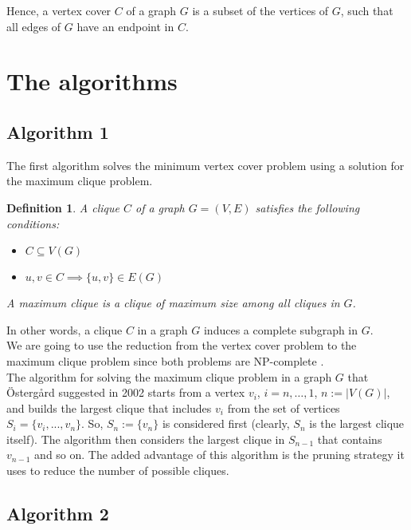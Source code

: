 \documentclass[11pt,a4paper]{article}
\newtheorem*{definition}{Definition}
\begin{document}
Hence, a vertex cover $C$ of a graph $G$ is a subset of the vertices of $G$, such that all edges of $G$ have an endpoint in $C$. \\


\section{The algorithms}

\subsection{Algorithm 1}
The first algorithm solves the minimum vertex cover problem using a solution for the maximum clique problem.
\begin{definition}
A \emph{clique} $C$ of a graph $G=(V,E)$ satisfies the following conditions:

\begin{itemize}
\item $C \subseteq V(G)$
\item $u, v \in C \implies \{u, v\} \in E(G)$
\end{itemize}

A \emph{maximum clique} is a clique of maximum size among all cliques in $G$.
\end{definition}

In other words, a clique $C$ in a graph $G$ induces a complete subgraph in $G$. \\

We are going to use the reduction from the vertex cover problem to the maximum clique problem since both problems are NP-complete \cite{Patric}.\\

The algorithm for solving the maximum clique problem in a graph $G$ that Östergård suggested in 2002 starts from a vertex $v_i$, $i=n, \dots, 1$, $n :=|V(G)|$, and builds the largest clique that includes $v_i$ from the set of vertices $S_i = \{v_i, ..., v_n\}$. So, $S_n := \{v_n\}$ is considered first (clearly, $S_n$ is the largest clique itself). The algorithm then considers the largest clique in $S_{n-1}$ that contains $v_{n-1}$ and so on. The added advantage of this algorithm is the pruning strategy it uses to reduce the number of possible cliques.


\subsection{Algorithm 2}
\end{document}
